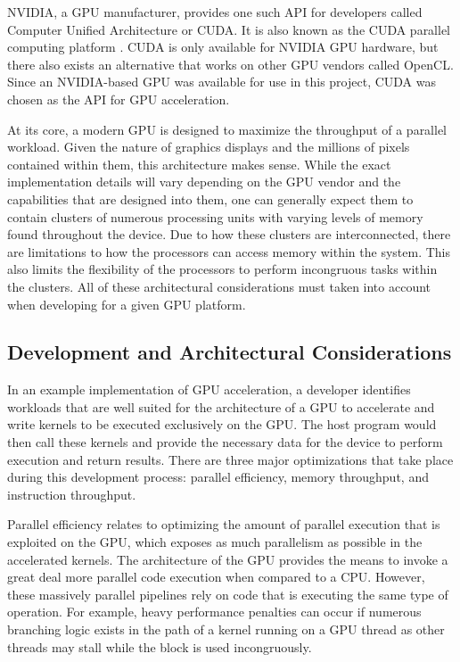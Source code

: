 \documentclass[conference, twoside]{IEEEtran}
\begin{document}
NVIDIA, a GPU manufacturer, provides one such API for developers called Computer Unified Architecture or CUDA. It is also known as the CUDA parallel computing platform \cite{nvidia-cuda}. CUDA is only available for NVIDIA GPU hardware, but there also exists an alternative that works on other GPU vendors called OpenCL. Since an NVIDIA-based GPU was available for use in this project, CUDA was chosen as the API for GPU acceleration.

At its core, a modern GPU is designed to maximize the throughput of a parallel workload. Given the nature of graphics displays and the millions of pixels contained within them, this architecture makes sense. While the exact implementation details will vary depending on the GPU vendor and the capabilities that are designed into them, one can generally expect them to contain clusters of numerous processing units with varying levels of memory found throughout the device. Due to how these clusters are interconnected, there are limitations to how the processors can access memory within the system. This also limits the flexibility of the processors to perform incongruous tasks within the clusters. All of these architectural considerations must taken into account when developing for a given GPU platform.

\subsection{Development and Architectural Considerations} %

In an example implementation of GPU acceleration, a developer identifies workloads that are well suited for the architecture of a GPU to accelerate and write kernels to be executed exclusively on the GPU. The host program would then call these kernels and provide the necessary data for the device to perform execution and return results. There are three major optimizations that take place during this development process: parallel efficiency, memory throughput, and instruction throughput.

Parallel efficiency relates to optimizing the amount of parallel execution that is exploited on the GPU, which exposes as much parallelism as possible in the accelerated kernels. The architecture of the GPU provides the means to invoke a great deal more parallel code execution when compared to a CPU. However, these massively parallel pipelines rely on code that is executing the same type of operation. For example, heavy performance penalties can occur if numerous branching logic exists in the path of a kernel running on a GPU thread as other threads may stall while the block is used incongruously.
\end{document}
